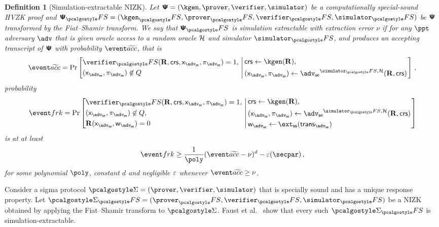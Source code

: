 \let\accentvec\vec \documentclass[runningheads,10pt]{llncs}
\newtheorem{definition}[theorem]{Definition}
\begin{document}
\begin{definition}[Simulation-extractable NIZK]
	\label{def:simext}
	Let $\ps = (\kgen, \prover, \verifier, \simulator)$ be a
	computationally special-sound HVZK proof and $\ps_\fs = (\kgen_\fs,
	\prover_\fs, \verifier_\fs, \simulator_\fs)$ be $\bm{\mathsf{\Psi}}$ transformed by the
	Fiat--Shamir transform.  We say that $\ps_\fs$ is simulation extractable
	with \emph{extraction error} $\nu$ if for any $\ppt$ adversary $\adv$ that
	is given oracle access to a random oracle $\mathcal{H}$ and simulator
	$\simulator_\fs$, and produces an accepting transcript of $\bm{\mathsf{\Psi}}$ with
	probability
	$\waccProb$, that is
	\[
		\waccProb = \Pr \left[
		\begin{aligned}
			& \verifier_\fs(\REL, \crs, \inp_\advse, \zkproof_\advse) = 1,\\
			& (\inp_\advse, \zkproof_\advse) \not\in Q
		\end{aligned}
		\, \left| \,
		\begin{aligned}
			& \crs \gets \kgen(\REL),\\
			& (\inp_\advse, \zkproof_\advse) \gets \advse^{\simulator_\fs,
			\ro} (\REL, \crs) 
		\end{aligned}
		\right.\right]\,,
	\]
	probability
	\[
		\frkProb = \Pr \left[
		\begin{aligned}
			& \verifier_\fs(\REL, \crs, \inp_\advse, \zkproof_\advse) = 1,\\
			& (\inp_\advse, \zkproof_\advse) \not\in Q,\\
			& \REL(\inp_\advse, \wit_\advse) = 0
		\end{aligned}
		\, \left| \,
		\begin{aligned}
			& \crs \gets \kgen(\REL),\\
			& (\inp_\advse, \zkproof_\advse) \gets \advse^{\simulator_\fs,
			\ro} (\REL, \crs) \\
			& \wit_\advse \gets \ext_\ss (\trans_{\advse}) 
		\end{aligned}
		\right.\right]
	\]
	is at at least 
	\[
		\frkProb \geq \frac{1}{\poly} (\waccProb - \nu)^d - \eps(\secpar)\,,
	\]
	for some polynomial $\poly$, constant $d$ and negligible $\varepsilon$ whenever $\waccProb \geq \nu$.
\end{definition}

Consider a sigma protocol $\sigmaprot = (\prover, \verifier, \simulator)$ that
is specially sound and has a unique response property. Let $\sigmaprot_\fs = (\prover_\fs, \verifier_\fs, \simulator_\fs)$ be a NIZK obtained by applying the Fiat--Shamir transform to $\sigmaprot$.
Faust et al.~\cite{INDOCRYPT:FKMV12} show that every such $\sigmaprot_\fs$ is simulation-extractable.
\end{document}
